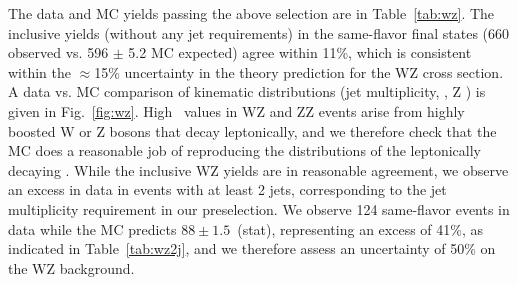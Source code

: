 The data and MC yields passing the above selection are in Table~\ref{tab:wz}. 
The inclusive yields (without any jet requirements) in the same-flavor final states (660 observed vs. 596 $\pm$ 5.2 MC expected) 
agree within 11\%, which is consistent within
the $\approx$15\% uncertainty in the theory prediction for the WZ cross section. A data vs. MC comparison of kinematic
distributions (jet multiplicity, \MET, Z \pt) is given in Fig.~\ref{fig:wz}. High \MET\ 
values in WZ and ZZ events arise from highly boosted W or Z bosons that decay leptonically, 
and we therefore check that the MC does a reasonable job of reproducing the \pt distributions of the 
leptonically decaying \Z. While the inclusive WZ yields are in reasonable agreement, we observe
an excess in data in events with at least 2 jets, corresponding to the jet multiplicity requirement
in our preselection. We observe 124 same-flavor events in data while the MC predicts $88\pm1.5$~(stat), representing an excess of 41\%,
as indicated in Table~\ref{tab:wz2j}, and we therefore assess an uncertainty of 50\% on the WZ background.



